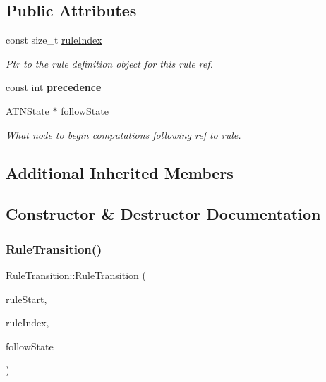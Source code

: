\subsection*{Public Attributes}
\begin{DoxyCompactItemize}
\item 
\mbox{\label{classantlr4_1_1atn_1_1RuleTransition_a061f690f1db9171f23d70e38b6fc2ec3}} 
const size\+\_\+t \hyperlink{classantlr4_1_1atn_1_1RuleTransition_a061f690f1db9171f23d70e38b6fc2ec3}{rule\+Index}
\begin{DoxyCompactList}\small\item\em Ptr to the rule definition object for this rule ref. \end{DoxyCompactList}\item 
\mbox{\label{classantlr4_1_1atn_1_1RuleTransition_ad7dd686620691fa1b89a176ecc92a043}} 
const int {\bfseries precedence}
\item 
\mbox{\label{classantlr4_1_1atn_1_1RuleTransition_a9ba63114a2ee50709140026ca76b9a99}} 
A\+T\+N\+State $\ast$ \hyperlink{classantlr4_1_1atn_1_1RuleTransition_a9ba63114a2ee50709140026ca76b9a99}{follow\+State}
\begin{DoxyCompactList}\small\item\em What node to begin computations following ref to rule. \end{DoxyCompactList}\end{DoxyCompactItemize}
\subsection*{Additional Inherited Members}


\subsection{Constructor \& Destructor Documentation}
\mbox{\label{classantlr4_1_1atn_1_1RuleTransition_a231adc7c039edce028eacf27526bd6b2}} 
\subsubsection{\texorpdfstring{Rule\+Transition()}{RuleTransition()}}
{\footnotesize\ttfamily Rule\+Transition\+::\+Rule\+Transition (\begin{DoxyParamCaption}\item[{\hyperlink{classantlr4_1_1atn_1_1RuleStartState}{Rule\+Start\+State} $\ast$}]{rule\+Start,  }\item[{size\+\_\+t}]{rule\+Index,  }\item[{A\+T\+N\+State $\ast$}]{follow\+State }\end{DoxyParamCaption})}

